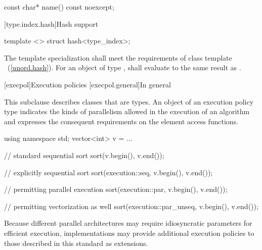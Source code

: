 %
\begin{itemdecl}
const char* name() const noexcept;
\end{itemdecl}

\begin{itemdescr}
\pnum
\returns {}
\end{itemdescr}

[type.index.hash]{Hash support}

%
\begin{itemdecl}
template <> struct hash<type_index>;
\end{itemdecl}

\begin{itemdescr}
\pnum
The template specialization shall meet the requirements of class template
~(\ref{unord.hash}). For an object  of type ,
 shall evaluate to the same result as .
\end{itemdescr}

[execpol]{Execution policies}
[execpol.general]{In general}

\pnum
This subclause describes classes that are  types. An
object of an execution policy type indicates the kinds of parallelism allowed
in the execution of an algorithm and expresses the consequent requirements on
the element access functions.
\begin{example}
\begin{codeblock}
using namespace std;
vector<int> v = ...

// standard sequential sort
sort(v.begin(), v.end());

// explicitly sequential sort
sort(execution::seq, v.begin(), v.end());

// permitting parallel execution
sort(execution::par, v.begin(), v.end());

// permitting vectorization as well
sort(execution::par_unseq, v.begin(), v.end());
\end{codeblock}
\end{example}
\begin{note}
Because different parallel architectures may require idiosyncratic
parameters for efficient execution, implementations
may provide additional execution policies to those described in this
standard as extensions.
\end{note}

